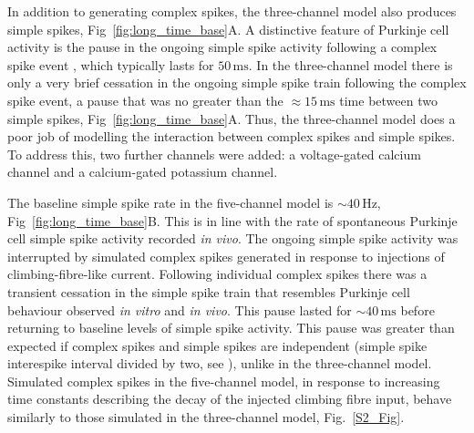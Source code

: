 \documentclass[utf8]{frontiersSCNS} %
\newcommand{\mse}{\,\mathrm{ms}}
\newcommand{\hz}{\,\mathrm{Hz}}
\begin{document}
In addition to generating complex spikes, the three-channel model also
produces simple spikes, Fig~\ref{fig:long_time_base}A. A distinctive
feature of Purkinje cell activity is the pause in the ongoing simple
spike activity following a complex spike event \cite{BellGrimm1969,GranitPhillips1956,Thach1967}, which typically lasts for
$50\mse$. In the three-channel model there is only a very brief
cessation in the ongoing simple spike train following the complex
spike event, a pause that was no greater than the $\approx 15\mse$
time between two simple spikes, Fig~\ref{fig:long_time_base}A. Thus,
the three-channel model does a poor job of modelling the interaction
between complex spikes and simple spikes. To address this, two further
channels were added: a voltage-gated calcium channel and a
calcium-gated potassium channel.



The baseline simple spike rate in the five-channel model is $\sim
40\hz$, Fig~\ref{fig:long_time_base}B. This is in line with the rate
of spontaneous Purkinje cell simple spike activity recorded \textit{in
  vivo}.  The ongoing simple spike activity was interrupted by
simulated complex spikes generated in response to injections of
climbing-fibre-like current. Following individual complex spikes there
was a transient cessation in the simple spike train that resembles
Purkinje cell behaviour observed \textit{in vitro} and \textit{in
  vivo}. This pause lasted for $\sim 40\mse$ before returning to
baseline levels of simple spike activity. This pause was greater than
expected if complex spikes and simple spikes are independent (simple
spike interespike interval divided by two, see \cite{XiaoEtAl2014}),
unlike in the three-channel model. Simulated complex spikes in the
five-channel model, in response to increasing time constants
describing the decay of the injected climbing fibre input, behave
similarly to those simulated in the three-channel model,
Fig.~\ref{S2_Fig}.
\end{document}

